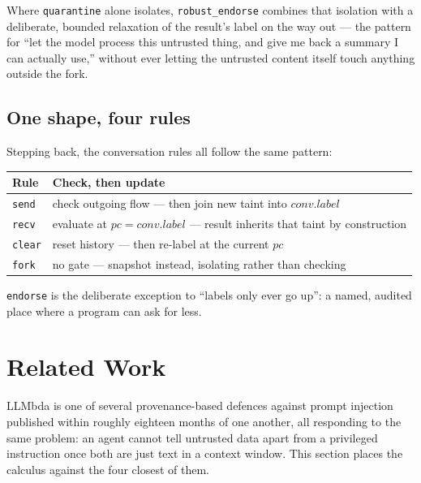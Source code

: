 \documentclass[11pt, a4paper]{article}
\begin{document}
\begin{descirption}
{Where \lstinline{quarantine} alone isolates, \lstinline{robust_endorse}
combines that isolation with a deliberate, bounded relaxation of the
result's label on the way out --- the pattern for ``let the model process
this untrusted thing, and give me back a summary I can actually use,''
without ever letting the untrusted content itself touch anything outside
the fork.

\subsection{One shape, four rules}

Stepping back, the conversation rules all follow the same pattern:

\begin{center}
\begin{tabular}{@{}ll@{}}
\toprule
Rule & Check, then update \\
\midrule
\texttt{send} & check outgoing flow --- then join new taint into $\mathit{conv}.\mathit{label}$ \\
\texttt{recv} & evaluate at $pc = \mathit{conv}.\mathit{label}$ --- result inherits that taint by construction \\
\texttt{clear} & reset history --- then re-label at the current $pc$ \\
\texttt{fork} & no gate --- snapshot instead, isolating rather than checking \\
\bottomrule
\end{tabular}
\end{center}

\lstinline{endorse} is the deliberate exception to ``labels only ever go
up'': a named, audited place where a program can ask for less.

\section{Related Work}
\label{sec:related-work}

LLMbda is one of several provenance-based defences against prompt
injection published within roughly eighteen months of one another, all
responding to the same problem: an agent cannot tell untrusted data
apart from a privileged instruction once both are just text in a
context window. This section places the calculus against the four
closest of them.

}
\end{descirption}
\end{document}
